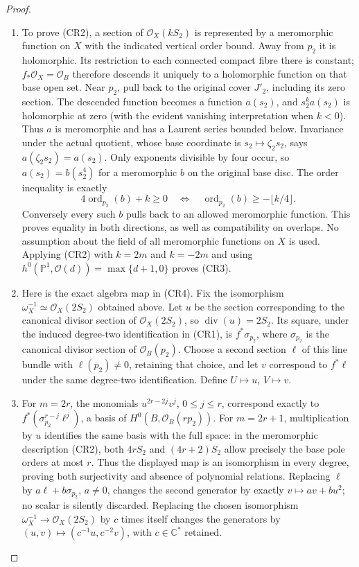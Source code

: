 \begin{proof}
\begin{enumerate}[label=\arabic*.,leftmargin=*]
\item To prove (CR2), a section of $\mathcal O_X(kS_2)$ is represented by
a meromorphic function on $X$ with the indicated vertical order bound.
Away from $p_2$ it is holomorphic. Its restriction to each connected
compact fibre there is constant; $f_*\mathcal O_X=\mathcal O_B$
therefore descends it uniquely to a holomorphic function on that base
open set. Near $p_2$, pull back to the original cover $J'_2$, including
its zero section. The descended function becomes a function $a(s_2)$,
and $s_2^k a(s_2)$ is holomorphic at zero (with the evident vanishing
interpretation when $k<0$). Thus $a$ is meromorphic and has a Laurent
series bounded below. Invariance under the actual quotient, whose base
coordinate is $s_2\mapsto\zeta_2s_2$, says
$a(\zeta_2s_2)=a(s_2)$. Only exponents divisible by four occur, so
$a(s_2)=b(s_2^4)$ for a meromorphic $b$ on the original base disc.
The order inequality is exactly
\[
 4\operatorname{ord}_{p_2}(b)+k\geq0
 \quad\Longleftrightarrow\quad
 \operatorname{ord}_{p_2}(b)\geq-\lfloor k/4\rfloor.
\]
Conversely every such $b$ pulls back to an allowed meromorphic function.
This proves equality in both directions, as well as compatibility on
overlaps. No assumption about the field of all meromorphic functions
on $X$ is used. Applying (CR2) with $k=2m$ and $k=-2m$ and using
$h^0(\mathbb P^1,\mathcal O(d))=\max\{d+1,0\}$ proves (CR3).

\item Here is the exact algebra map in (CR4). Fix the isomorphism
$\omega_X^{-1}\simeq\mathcal O_X(2S_2)$ obtained above. Let $u$ be
the section corresponding to the canonical divisor section of
$\mathcal O_X(2S_2)$, so $\operatorname{div}(u)=2S_2$.
Its square, under the induced degree-two identification in (CR1),
is $f^*\sigma_{p_2}$, where $\sigma_{p_2}$ is the canonical divisor
section of $\mathcal O_B(p_2)$. Choose a second section $\ell$ of this
line bundle with $\ell(p_2)\ne0$, retaining that choice, and let $v$
correspond to $f^*\ell$ under the same degree-two identification.
Define $U\mapsto u$, $V\mapsto v$.

\item For $m=2r$, the monomials $u^{2r-2j}v^j$, $0\leq j\leq r$,
correspond exactly to
$f^*(\sigma_{p_2}^{r-j}\ell^j)$, a basis of
$H^0(B,\mathcal O_B(rp_2))$. For $m=2r+1$, multiplication by $u$
identifies the same basis with the full space: in the meromorphic
description (CR2), both $4rS_2$ and $(4r+2)S_2$ allow precisely
the base pole orders at most $r$. Thus the displayed map is an
isomorphism in every degree, proving both surjectivity and absence of
polynomial relations. Replacing $\ell$ by $a\ell+b\sigma_{p_2}$,
$a\ne0$, changes the second generator by exactly
$v\mapsto av+bu^2$; no scalar is silently discarded.
Replacing the chosen isomorphism $\omega_X^{-1}\to\mathcal O_X(2S_2)$
by $c$ times itself changes the generators by
$(u,v)\mapsto(c^{-1}u,c^{-2}v)$, with $c\in\mathbb C^*$ retained.


\end{enumerate}
\end{proof}
